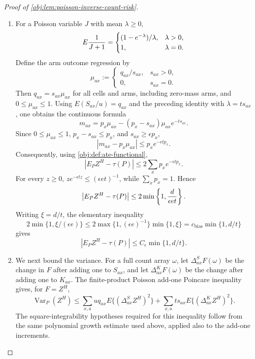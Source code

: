 \documentclass[11pt]{article}
\begin{document}
\begin{proof}[Proof of \cref{obj:lem:poisson-inverse-count-risk}]
\begin{enumerate}
\item
For a Poisson variable \(J\) with mean \(\lambda\ge0\),
\[
E{1\over J+1}=
\begin{cases}
(1-e^{-\lambda})/\lambda,&\lambda>0,\\
1,&\lambda=0.
\end{cases}
\]
Define the arm outcome regression by
\[
\mu_{ax}:=
\begin{cases}
q_{ax}/s_{ax},& s_{ax}>0,\\
0,& s_{ax}=0.
\end{cases}
\]
Then \(q_{ax}=s_{ax}\mu_{ax}\) for all cells and arms, including zero-mass arms, and \(0\le \mu_{ax}\le1\).  Using \(E(S_{ax}/u)=q_{ax}\) and the preceding identity with
\(\lambda=ts_{ax}\), one obtains the continuous formula
\[
m_{ax}
=
p_x\mu_{ax}-(p_x-s_{ax})\mu_{ax}e^{-ts_{ax}}.
\]
Since \(0\le \mu_{ax}\le1\), \(p_x-s_{ax}\le p_x\), and \(s_{ax}\ge\epsilon p_x\),
\[
|m_{ax}-p_x\mu_{ax}|
\le p_x e^{-\epsilon t p_x}.
\]
Consequently, using \cref{obj:def:ate-functional},
\[
\left|E_P Z^H-\tau(P)\right|
\le
2\sum_x p_x e^{-\epsilon t p_x}.
\]
For every \(z\ge0\), \(z e^{-\epsilon tz}\le(\epsilon e t)^{-1}\), while
\(\sum_xp_x=1\).  Hence
\[
\left|E_P Z^H-\tau(P)\right|
\le
2\min\left\{1,{d\over \epsilon e t}\right\}.
\]
Writing \(\xi=d/t\), the elementary inequality
\[
2\min\{1,\xi/(\epsilon e)\}
\le
2\max\{1,(\epsilon e)^{-1}\}\min\{1,\xi\}
=
c_{\mathrm{bias}}\min\{1,d/t\}
\]
gives
\[
\left|E_P Z^H-\tau(P)\right|
\le C_\epsilon\min\{1,d/t\}.
\]

\item
We next bound the variance.  For a full count array \(\omega\), let
\(\Delta^S_{ax}F(\omega)\) be the change in \(F\) after adding one to \(S_{ax}\), and let
\(\Delta^K_{ax}F(\omega)\) be the change after adding one to \(K_{ax}\).  The finite-product Poisson add-one Poincare inequality gives, for \(F=Z^H\),
\[
\operatorname{Var}_P(Z^H)
\le
\sum_{x,a}
u q_{ax}E\{(\Delta^S_{ax}Z^H)^2\}
+
\sum_{x,a}
t s_{ax}E\{(\Delta^K_{ax}Z^H)^2\}.
\]
The square-integrability hypotheses required for this inequality follow from the same polynomial growth estimate used above, applied also to the add-one increments. %


\end{enumerate}
\end{proof}
\end{document}

